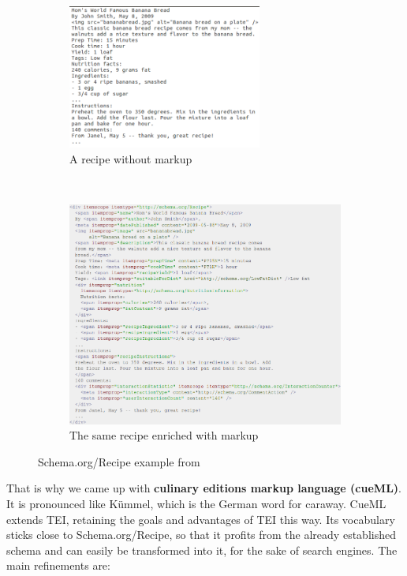 \documentclass[12pt, twoside]{report}
\begin{document}
\begin{figure}[H]
	\begin{subfigure}{1\textwidth}
		\centering
		\includegraphics[width=0.7\textwidth]{Images/schemaRecipeWithoutMarkup}
		\caption{A recipe without markup}\vspace{1em}
	\end{subfigure} \\
	\begin{subfigure}{1\textwidth}
		\centering
		\includegraphics[width=1\textwidth]{Images/schemaRecipeWithMarkup}
		\caption{The same recipe enriched with markup}
	\end{subfigure}
	\caption{Schema.org/Recipe example from \parencite{schemaOrg}}
	\label{fig:schemaOrgRecipe}
\end{figure}


That is why we came up with \textbf{culinary editions markup language (cueML)}. It is pronounced like Kümmel, which is the German word for caraway. CueML extends TEI, retaining the goals and advantages of TEI this way. Its vocabulary sticks close to Schema.org/Recipe, so that it profits from the already established schema and can easily be transformed into it, for the sake of search engines. The main refinements are:
\end{document}

